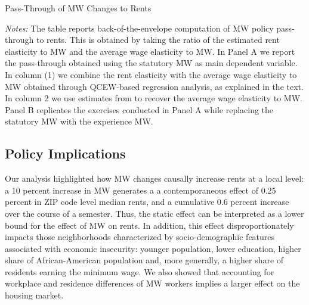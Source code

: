\begin{table}[!h] 
	\centering
	\caption{Pass-Through of MW Changes to Rents}
	\label{tab:passthrough}  
	
	\begin{minipage}{0.95\textwidth} \footnotesize
		\vspace{2mm}
		\textit{Notes:} The table reports back-of-the-envelope computation of MW 
		policy pass-through to rents. This is obtained by taking the ratio of the 
		estimated rent elasticity to MW and the average wage elasticity to MW. 
		In Panel A we report the pass-through obtained using the statutory MW as 
		main dependent variable. In column (1) we combine the rent elasticity with 
		the average wage elasticity to MW obtained through QCEW-based regression
		analysis, as explained in the text. In column 2 we use estimates
		from \textcite{CegnizEtAl2019} to recover the average wage elasticity to MW. 
		Panel B replicates the exercises conducted in Panel A while replacing the 
		statutory MW with the experience MW. 
	\end{minipage}
\end{table}

\subsection{Policy Implications}\label{sec:policy}

Our analysis highlighted how MW changes causally increase rents at a local level: a 10 
percent increase in MW generates a a contemporaneous effect of 0.25 percent in ZIP code 
level median rents, and a cumulative 0.6 percent increase over the course of a semester. 
Thus, the static effect can be interpreted as a lower bound for the effect of MW on rents. 
In addition, this effect disproportionately impacts those neighborhoods characterized by 
socio-demographic features associated with economic insecurity: younger population, lower 
education, higher share of African-American population and, more generally, a higher share 
of residents earning the minimum wage. We also showed that accounting for workplace and 
residence differences of MW workers implies a larger effect on the housing market.

